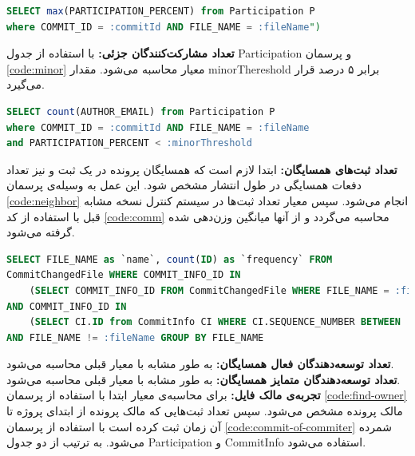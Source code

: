 \begin{latin}
	\begin{lstlisting}[language=SQL]
SELECT max(PARTICIPATION_PERCENT) from Participation P 
where COMMIT_ID = :commitId AND FILE_NAME = :fileName")
\end{lstlisting}
\end{latin}
\label{code:own}

\textbf{تعداد مشارکت‌کنندگان جزئی:‬}
 با استفاده از جدول Participation و پرسمان  \ref{code:minor}  معیار محاسبه می‌شود. مقدار minorThereshold برابر ۵ درصد قرار می‌گیرد.

\begin{latin}
	\begin{lstlisting}[language=SQL]
SELECT count(AUTHOR_EMAIL) from Participation P 
where COMMIT_ID = :commitId AND FILE_NAME = :fileName
and PARTICIPATION_PERCENT < :minorThreshold
\end{lstlisting}
\end{latin}
\label{code:minor}

\textbf{تعداد ثبت‌های همسایگان:‬}
ابتدا لازم است که همسایگان پرونده در یک ثبت و نیز تعداد دفعات همسایگی در طول انتشار مشخص شود. این عمل به وسیله‌ی پرسمان \ref{code:neighbor} انجام می‌شود. سپس معیار تعداد ثبت‌ها در سیستم کنترل نسخه مشابه قبل با استفاده از کد \ref{code:comm} محاسبه می‌گردد و از آنها میانگین وزن‌دهی شده گرفته می‌شود.

\begin{latin}
\begin{lstlisting}[language=SQL]
SELECT FILE_NAME as `name`, count(ID) as `frequency` FROM
CommitChangedFile WHERE COMMIT_INFO_ID IN
	(SELECT COMMIT_INFO_ID FROM CommitChangedFile WHERE FILE_NAME = :fileName) 
AND COMMIT_INFO_ID IN
	(SELECT CI.ID from CommitInfo CI WHERE CI.SEQUENCE_NUMBER BETWEEN :startSeq AND :endSeq AND PROJECT = :project)
AND FILE_NAME != :fileName GROUP BY FILE_NAME
\end{lstlisting}
\end{latin}
\label{code:neighbor}

\textbf{تعداد توسعه‌دهندگان فعال همسایگان:‬}
 به طور مشابه با معیار قبلی محاسبه می‌شود.\\
\textbf{‫تعداد توسعه‌دهندگان متمایز همسایگان:‬}
 به طور مشابه با معیار قبلی محاسبه می‌شود. \\

\textbf{تجربه‌ی مالک فایل:‬‬}
 برای محاسبه‌ی معیار ابتدا   با استفاده از پرسمان \ref{code:find-owner} مالک پرونده مشخص می‌شود. سپس تعداد ثبت‌هایی که مالک پرونده از ابتدای پروژه تا آن زمان ثبت کرده است  با استفاده از پرسمان \ref{code:commit-of-commiter} شمرده می‌شود. به ترتیب از دو جدول Participation 
 و 
 CommitInfo  استفاده می‌شود.

